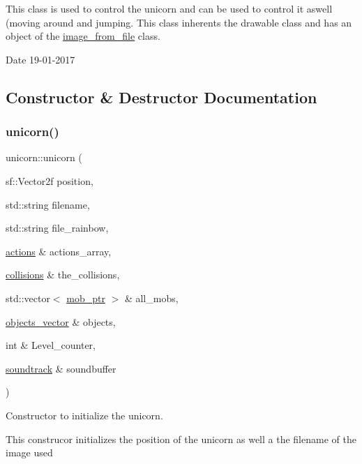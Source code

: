 This class is used to control the unicorn and can be used to control it aswell (moving around and jumping. This class inherents the drawable class and has an object of the \hyperlink{classimage__from__file}{image\+\_\+from\+\_\+file} class.

\begin{DoxyDate}{Date}
19-\/01-\/2017 
\end{DoxyDate}


\subsection{Constructor \& Destructor Documentation}
\mbox{\label{classunicorn_a89d3654cfd56c282b5061082e6864245}} 
\subsubsection{\texorpdfstring{unicorn()}{unicorn()}}
{\footnotesize\ttfamily unicorn\+::unicorn (\begin{DoxyParamCaption}\item[{sf\+::\+Vector2f}]{position,  }\item[{std\+::string}]{filename,  }\item[{std\+::string}]{file\+\_\+rainbow,  }\item[{\hyperlink{typedefs_8hpp_a38f93e4749e0d65d51360c429766d212}{actions} \&}]{actions\+\_\+array,  }\item[{\hyperlink{typedefs_8hpp_a7e1a7f34f6d09dabb4cdafd6e4118603}{collisions} \&}]{the\+\_\+collisions,  }\item[{std\+::vector$<$ \hyperlink{typedefs_8hpp_a09ee7f853fc9bc830a9445a06fd53d4b}{mob\+\_\+ptr} $>$ \&}]{all\+\_\+mobs,  }\item[{\hyperlink{typedefs_8hpp_a6c0fdb1dfd0c34dbbdbb5dcd3c608b07}{objects\+\_\+vector} \&}]{objects,  }\item[{int \&}]{Level\+\_\+counter,  }\item[{\hyperlink{classsoundtrack}{soundtrack} \&}]{soundbuffer }\end{DoxyParamCaption})}



Constructor to initialize the unicorn. 

This construcor initializes the position of the unicorn as well a the filename of the image used


